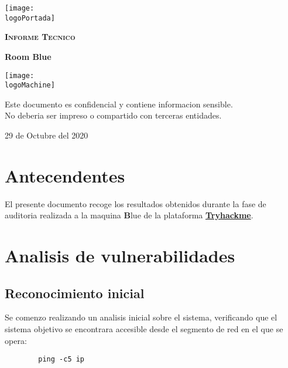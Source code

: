 \documentclass[a4paper]{article}%
\newcommand{\logoPortada}{thm.png}
\newcommand{\machineName}{Blue} %
\newcommand{\logoMachine}{machine.png} %
\newcommand{\startDate}{29 de Octubre del 2020}
\begin{document}
	\cfoot{\thepage}
	\begin{titlepage}
	\centering
	\texttt{[image: \\logoPortada]}\par\vspace{1cm}
	{\scshape\LARGE \textbf{Informe Tecnico}\par }
	\vspace{0.2cm}
	{\Huge\bfseries\textcolor{greenPortada}{Room \machineName}\par}
	\vfill\vfill
	\texttt{[image: \\logoMachine]}\par\vspace{1cm}
	\vfill
	\begin{tcolorbox}[colback=red!5!white,colframe=red!75!black]
		\centering
		Este documento es confidencial y contiene informacion sensible.\\No deberia
		ser impreso o compartido con terceras entidades.
	\end{tcolorbox}	
	\vfill
	{\large \startDate\par}
	\vfill
	\end{titlepage}
	\clearpage
	\tableofcontents
	\clearpage
	\section{Antecendentes}
	El presente documento recoge los resultados obtenidos durante la fase de auditoria
	realizada a la maquina {\textbf\machineName} de la plataforma 
	\href{https://tryhackme.com}{\textbf{Tryhackme}}. 
	\vspace{0.2cm}

	\section{Analisis de vulnerabilidades}
	\subsection{Reconocimiento inicial}

	\vspace{0.2cm}
	Se comenzo realizando un analisis inicial sobre el sistema, verificando que el sistema
	objetivo se encontrara accesible desde el segmento de red en el que se opera:

	\begin{verbatim}
		ping -c5 ip
	\end{verbatim}
\end{document}
